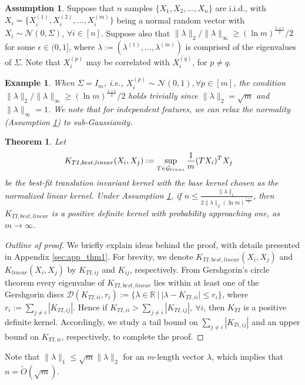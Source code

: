 \documentclass{article}
\theoremstyle{plain}
\newtheorem{theorem}{Theorem}
\newtheorem{example}{Example}
\theoremstyle{definition}
\newtheorem{assumption}{Assumption}
\theoremstyle{remark}
\begin{document}
\begin{assumption}
\label{ass:prob}
Suppose that $n$ samples $\{X_1, X_2, \dots, X_n\}$ are i.i.d., with $X_i = \{X_{i}^{(1)}, X_{i}^{(2)}, \dots, X_{i}^{(m)}\}$ being a normal random vector with $X_i \sim \mathcal{N}(0, \Sigma)$, $\forall i \in [n]$. Suppose also that $\|\lambda\|_2 / \|\lambda\|_{\infty} \geq (\ln m)^{\frac{1+\epsilon}{2}} / 2$ for some $\epsilon \in (0, 1]$, where $\lambda := (\lambda^{(1)}, \dots, \lambda^{(m)})$ is comprised of the eigenvalues of $\Sigma$. Note that $X_i^{(p)}$ may be correlated with $X_{i}^{(q)}$, for $p \neq q$.
\end{assumption}

\begin{example}
When $\Sigma = I_{m}$, i.e., $X_i^{(p)} \sim \mathcal{N}(0, 1), \forall p \in [m]$, the condition $\|\lambda\|_2 / \|\lambda\|_{\infty} \geq (\ln m)^{\frac{1+\epsilon}{2}} / 2$ holds trivially since $\|\lambda\|_2 = \sqrt{m}$ and $\|\lambda\|_{\infty} = 1$. We note that for independent features, we can relax the normality (Assumption \ref{ass:prob}) to sub-Gaussianity.
\end{example}

\begin{theorem} \label{thm1}
Let 
\begin{align}
K_{TI,best,linear}(X_i,X_j) &:= \sup_{T \in {\cal{G}}_{trans}} \frac{1}{m} (TX_i)^T X_j
\end{align}
be the best-fit translation invariant kernel with the base kernel chosen as the normalized linear kernel. Under Assumption \ref{ass:prob}, if $n \leq \frac{\|\lambda\|_1}{2\|\lambda\|_2 (\ln m)^{\frac{1+\epsilon}{2}}}$, then $K_{TI,best,linear}$ is a positive definite kernel with probability approaching one, as $m \to \infty$.
\end{theorem}
\begin{proof}[Outline of proof]
We briefly explain ideas behind the proof, with details presented in Appendix \ref{sec:app_thm1}. For brevity, we denote $K_{TI,best,linear}(X_i, X_j)$ and $K_{linear}(X_i, X_j)$ by $K_{TI,ij}$ and $K_{ij}$, respectively. From Gershgorin's circle theorem \cite{varga2010gervsgorin} every eigenvalue of $K_{TI,best,linear}$ lies within at least one of the Gershgorin discs $\mathcal{D}(K_{TI,ii}, r_i) := \{\lambda \in \mathbb{R} \ | \ |\lambda - K_{TI,ii}| \le r_i\}$, where $r_i := \sum_{j \ne i} |K_{TI,ij}|$. Hence if $K_{TI,ii} > \sum_{j \ne i} |K_{TI,ij}|, \  \forall i$, then $K_{TI}$ is a positive definite kernel. Accordingly, we study a tail bound on $\sum_{j \neq i} |K_{Ti, ij}|$ and an upper bound on $K_{TI, ii}$, respectively, to complete the proof.
\end{proof}
Note that $\|\lambda\|_1 \leq \sqrt{m} \|\lambda\|_2$ for an $m$-length vector $\lambda$, which implies that $n = \tilde{O}(\sqrt{m})$.
\end{document}
